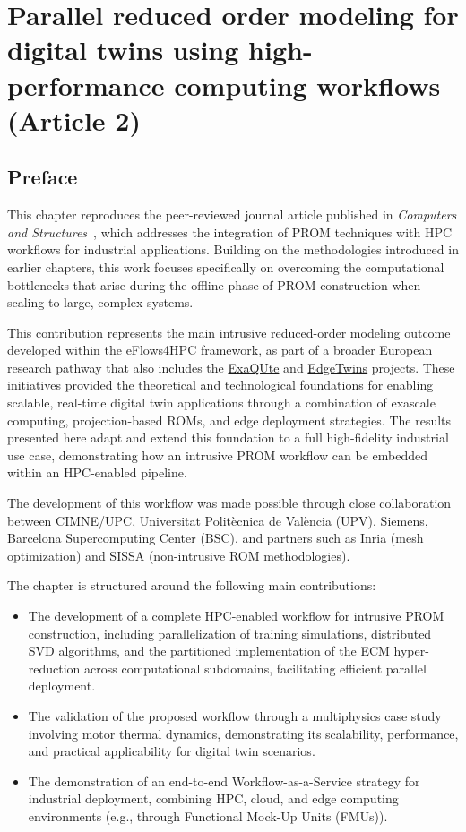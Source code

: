 \chapter{Parallel reduced order modeling for digital twins using high-performance computing workflows (Article 2)}
\label{chap:article2}

\section*{Preface}

This chapter reproduces the peer-reviewed journal article published in \emph{Computers and Structures}~\cite{Ares2024}, which addresses the integration of PROM techniques with HPC workflows for industrial applications. Building on the methodologies introduced in earlier chapters, this work focuses specifically on overcoming the computational bottlenecks that arise during the offline phase of PROM construction when scaling to large, complex systems.

This contribution represents the main intrusive reduced-order modeling outcome developed within the \href{https://www.eflows4hpc.eu/}{eFlows4HPC} framework, as part of a broader European research pathway that also includes the \href{https://cordis.europa.eu/project/id/800898}{ExaQUte} and \href{https://cordis.europa.eu/project/id/946009}{EdgeTwins} projects. These initiatives provided the theoretical and technological foundations for enabling scalable, real-time digital twin applications through a combination of exascale computing, projection-based ROMs, and edge deployment strategies. The results presented here adapt and extend this foundation to a full high-fidelity industrial use case, demonstrating how an intrusive PROM workflow can be embedded within an HPC-enabled pipeline.

The development of this workflow was made possible through close collaboration between CIMNE/UPC, Universitat Politècnica de València (UPV), Siemens, Barcelona Supercomputing Center (BSC), and partners such as Inria (mesh optimization) and SISSA (non-intrusive ROM methodologies).

The chapter is structured around the following main contributions:
\begin{itemize}
    \item The development of a complete HPC-enabled workflow for intrusive PROM construction, including parallelization of training simulations, distributed SVD algorithms, and the partitioned implementation of the ECM hyper-reduction across computational subdomains, facilitating efficient parallel deployment.
    \item The validation of the proposed workflow through a multiphysics case study involving motor thermal dynamics, demonstrating its scalability, performance, and practical applicability for digital twin scenarios.
    \item The demonstration of an end-to-end Workflow-as-a-Service strategy for industrial deployment, combining HPC, cloud, and edge computing environments (e.g., through Functional Mock-Up Units (FMUs)).
\end{itemize}

